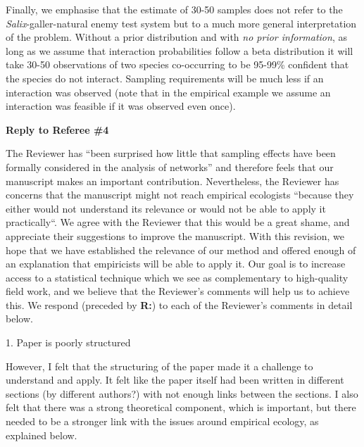 \documentclass[12pt]{letter}
\newenvironment{refquote}{\bigskip \begin{it}}{\end{it}\smallskip}
\begin{document}
		Finally, we emphasise that the estimate of 30-50 samples does not refer to the \emph{Salix}-galler-natural enemy test system but to a much more general interpretation of the problem. Without a prior distribution and with \emph{no prior information}, as long as we assume that interaction probabilities follow a beta distribution it will take 30-50 observations of two species co-occurring to be 95-99\% confident that the species do not interact. Sampling requirements will be much less if an interaction was observed (note that in the empirical example we assume an interaction was feasible if it was observed even once).


\clearpage

{\Large \bf Reply to Referee \#4}


	The Reviewer has ``been surprised how little that sampling effects have been formally considered in the analysis of networks'' and therefore feels that our manuscript makes an important contribution. Nevertheless, the Reviewer has concerns that the manuscript might not reach empirical ecologists ``because they either would not understand its relevance or would not be able to apply it practically``. We agree with the Reviewer that this would be a great shame, and appreciate their suggestions to improve the manuscript. With this revision, we hope that we have established the relevance of our method and offered enough of an explanation that empiricists will be able to apply it. Our goal is to increase access to a statistical technique which we see as complementary to high-quality field work, and we believe that the Reviewer's comments will help us to achieve this. We respond (preceded by \textbf{R:}) to each of the Reviewer's comments in detail below.


	1. Paper is poorly structured

		\begin{refquote}
		However, I felt that the structuring of the paper made it a challenge to understand and apply. It felt like the paper itself had been written in different sections (by different authors?) with not enough links between the sections. I also felt that there was a strong theoretical component, which is important, but there needed to be a stronger link with the issues around empirical ecology, as explained below.
		\end{refquote}
\end{document}
